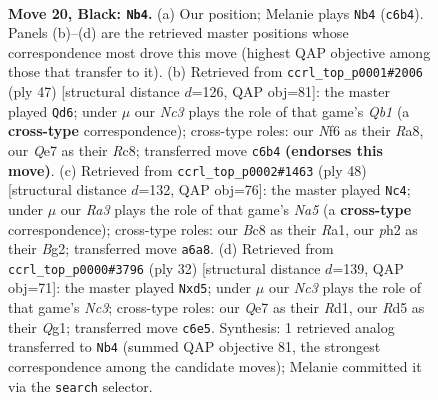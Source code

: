 \documentclass[11pt]{article}
\begin{document}
\clearpage

\begin{figure}[p]\centering
\begin{subfigure}{0.46\textwidth}\centering
\resizebox{\linewidth}{!}{%
\newchessgame
\chessboard[
  setfen={2b5/1p2qpkp/r1n2np1/p2rB1Q1/P7/NP3NP1/5PBP/R3R1K1 b - - 2 20},
  showmover=false,
  pgfstyle=straightmove, color=movearrow, markmove={c6-b4}
]}
\caption{}
\end{subfigure}\hfill
\begin{subfigure}{0.46\textwidth}\centering
\resizebox{\linewidth}{!}{%
\newchessgame
\chessboard[
  setfen={rqr3k1/4ppbp/2B2np1/p7/1pQB1n2/5N2/PP3PPP/3RR1K1 b - - 5 24},
  showmover=false,
  pgfstyle=straightmove, color=movearrow, markmove={b8-d6}
]}
\caption{}
\end{subfigure}
\\[4pt]
\begin{subfigure}{0.46\textwidth}\centering
\resizebox{\linewidth}{!}{%
\newchessgame
\chessboard[
  setfen={1r2r1k1/1pp2ppp/p4n2/N2Pbq1b/1P6/P1N3P1/3Q1PBP/R3R1K1 w - - 0 25},
  showmover=false,
  pgfstyle=straightmove, color=movearrow, markmove={a5-c4}
]}
\caption{}
\end{subfigure}\hfill
\begin{subfigure}{0.46\textwidth}\centering
\resizebox{\linewidth}{!}{%
\newchessgame
\chessboard[
  setfen={r4rk1/pp3p1p/2n1pnp1/q2b4/5P2/P1N2NP1/1PP1B2P/2KR2QR w - - 0 17},
  showmover=false,
  pgfstyle=straightmove, color=movearrow, markmove={c3-d5}
]}
\caption{}
\end{subfigure}
\caption{\textbf{Move 20, Black: \texttt{Nb4}.} (a) Our position; Melanie plays \texttt{Nb4} (\texttt{c6b4}). Panels (b)--(d) are the retrieved master positions whose correspondence most drove this move (highest QAP objective among those that transfer to it). (b) Retrieved from \texttt{ccrl\_top\_p0001\#2006} (ply 47) [structural distance $d$=126, QAP obj=81]: the master played \texttt{Qd6}; under $\mu$ our \emph{Nc3} plays the role of that game's \emph{Qb1} (a \textbf{cross-type} correspondence); cross-type roles: our \emph{N}f6 as their \emph{R}a8, our \emph{Q}e7 as their \emph{R}c8; transferred move \texttt{c6b4} \textbf{(endorses this move)}. (c) Retrieved from \texttt{ccrl\_top\_p0002\#1463} (ply 48) [structural distance $d$=132, QAP obj=76]: the master played \texttt{Nc4}; under $\mu$ our \emph{Ra3} plays the role of that game's \emph{Na5} (a \textbf{cross-type} correspondence); cross-type roles: our \emph{B}c8 as their \emph{R}a1, our \emph{p}h2 as their \emph{B}g2; transferred move \texttt{a6a8}. (d) Retrieved from \texttt{ccrl\_top\_p0000\#3796} (ply 32) [structural distance $d$=139, QAP obj=71]: the master played \texttt{Nxd5}; under $\mu$ our \emph{Nc3} plays the role of that game's \emph{Nc3}; cross-type roles: our \emph{Q}e7 as their \emph{R}d1, our \emph{R}d5 as their \emph{Q}g1; transferred move \texttt{c6e5}. Synthesis: 1 retrieved analog transferred to \texttt{Nb4} (summed QAP objective 81, the strongest correspondence among the candidate moves); Melanie committed it via the \texttt{search} selector.}
\label{fig:thought-m39}
\end{figure}
\end{document}
